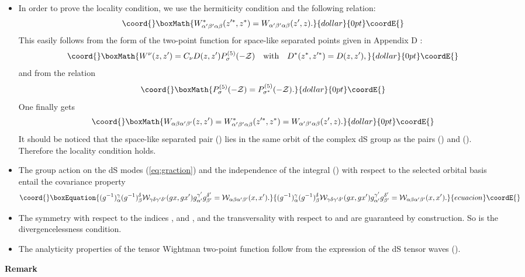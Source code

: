 \documentclass[a4paper,11pt,showpacs,preprintnumbers]{revtex4}
\def\z {{\cal Z}}
\begin{document}
\begin{itemize}
\item In order to prove the locality condition, we use  the hermiticity
condition and the following relation:
$$\coord{}\boxMath{ W^{*}_{\alpha'\beta'\alpha\beta
}(z'^*,z^*)=W_{\alpha'\beta' \alpha\beta }(z',z).}{dollar}{0pt}\coordE{}$$ This  easily
follows from the form of the two-point function for space-like
separated points given in Appendix D :
$$\coord{}\boxMath{W^{\nu}(z,z')=C_{\nu}D(z,z')P_{\sigma}^{(5)}(-\z)\quad\mbox{with}\quad
D^{*}(z^*,z'^{*})=D(z,z'),}{dollar}{0pt}\coordE{}$$ and from the  relation \cite{brvia}
$$\coord{}\boxMath{P_{\sigma}^{(5)}(-\z) =P_{\sigma^{*}}^{(5)}(-\z). }{dollar}{0pt}\coordE{}$$ One finally gets
$$\coord{}\boxMath{W_{\alpha\beta\alpha'\beta'
}(z,z')=W_{\alpha'\beta'\alpha\beta}^*(z^{\prime*},z^*)=W_{\alpha'\beta'
\alpha\beta }(z',z).
}{dollar}{0pt}\coordE{}$$
It should be noticed that the space-like separated pair (\coordHE{})
lies in the same orbit of the complex dS group as the pairs
(\coordHE{}) and (\coordHE{}). Therefore the locality condition
\coordHE{} holds.

\item The group action on the dS modes (\ref{eq:graction})
and the independence of the integral  (\myHighlight{$\ref{eq:int}$}\coordHE{}) with
respect to the selected orbital basis  entail the covariance
property
\begin{equation}\coord{}\boxEquation{
(g^{-1})^{\gamma}_{\alpha}(g^{-1})^{\delta}_{\beta} {\cal
W}_{\gamma\delta \gamma'\delta'} (g x,g x')g^{\gamma'}_{\alpha'}
g^{\delta'}_{\beta'}= {\cal W}_{\alpha\beta \alpha'\beta'}(x,x') .
}{
(g^{-1})^{\gamma}_{\alpha}(g^{-1})^{\delta}_{\beta} {\cal
W}_{\gamma\delta \gamma'\delta'} (g x,g x')g^{\gamma'}_{\alpha'}
g^{\delta'}_{\beta'}= {\cal W}_{\alpha\beta \alpha'\beta'}(x,x') .
}{ecuacion}\coordE{}\end{equation}
\item The symmetry with respect to the indices \myHighlight{$\alpha$}\coordHE{}, \myHighlight{$\beta$}\coordHE{}
and \coordHE{}, \coordHE{} and the transversality with respect to \coordHE{}
and \coordHE{} are guaranteed by construction. So is the divergencelessness
condition.
\item The analyticity properties of the tensor Wightman two-point
function follow from the expression of the dS tensor waves
(\myHighlight{$\ref{eq:dswave}$}\coordHE{}).
\end{itemize}
{\bf Remark}
\end{document}
